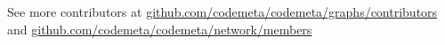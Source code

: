 \documentclass[final,hyperref={pdfpagelabels=false},xcolor=svgnames]{beamer}
\begin{document}
\begin{frame}[t,fragile]
\begin{columns}[t]
\begin{column}{.33\paperwidth}
	See more contributors at
	\href{https://github.com/codemeta/codemeta/graphs/contributors}{github.com/codemeta/codemeta/graphs/contributors}
	and
	\href{https://github.com/codemeta/codemeta/network/members}{github.com/codemeta/codemeta/network/members}
  \end{column}
\end{columns}
\end{frame}
\end{document}
